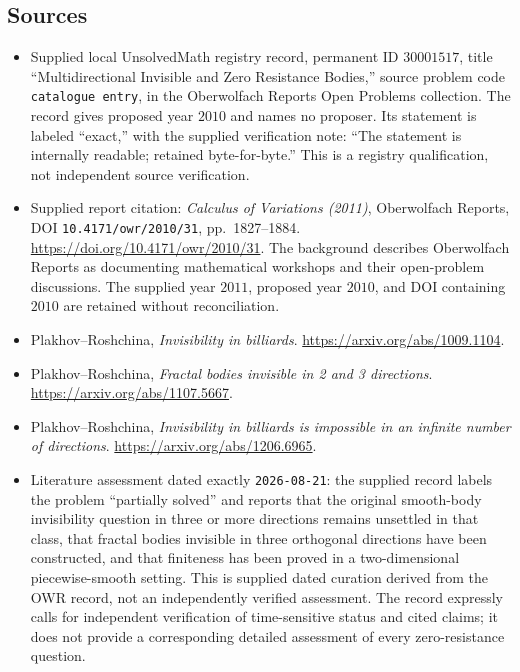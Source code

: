 \documentclass[11pt]{article}
\begin{document}
\subsection{Sources}
\begin{itemize}
\item Supplied local UnsolvedMath registry record, permanent ID \(30001517\), title ``Multidirectional Invisible and Zero Resistance Bodies,'' source problem code \texttt{catalogue entry}, in the Oberwolfach Reports Open Problems collection. The record gives proposed year \(2010\) and names no proposer. Its statement is labeled ``exact,'' with the supplied verification note: ``The statement is internally readable; retained byte-for-byte.'' This is a registry qualification, not independent source verification.
\item Supplied report citation: \emph{Calculus of Variations (2011)}, Oberwolfach Reports, DOI \texttt{10.4171/owr/2010/31}, pp.\ 1827--1884. \url{https://doi.org/10.4171/owr/2010/31}. The background describes Oberwolfach Reports as documenting mathematical workshops and their open-problem discussions. The supplied year \(2011\), proposed year \(2010\), and DOI containing \(2010\) are retained without reconciliation.
\item Plakhov--Roshchina, \emph{Invisibility in billiards}. \url{https://arxiv.org/abs/1009.1104}.
\item Plakhov--Roshchina, \emph{Fractal bodies invisible in 2 and 3 directions}. \url{https://arxiv.org/abs/1107.5667}.
\item Plakhov--Roshchina, \emph{Invisibility in billiards is impossible in an infinite number of directions}. \url{https://arxiv.org/abs/1206.6965}.
\item Literature assessment dated exactly \texttt{2026-08-21}: the supplied record labels the problem ``partially solved'' and reports that the original smooth-body invisibility question in three or more directions remains unsettled in that class, that fractal bodies invisible in three orthogonal directions have been constructed, and that finiteness has been proved in a two-dimensional piecewise-smooth setting. This is supplied dated curation derived from the OWR record, not an independently verified assessment. The record expressly calls for independent verification of time-sensitive status and cited claims; it does not provide a corresponding detailed assessment of every zero-resistance question.
\end{itemize}
\end{document}
